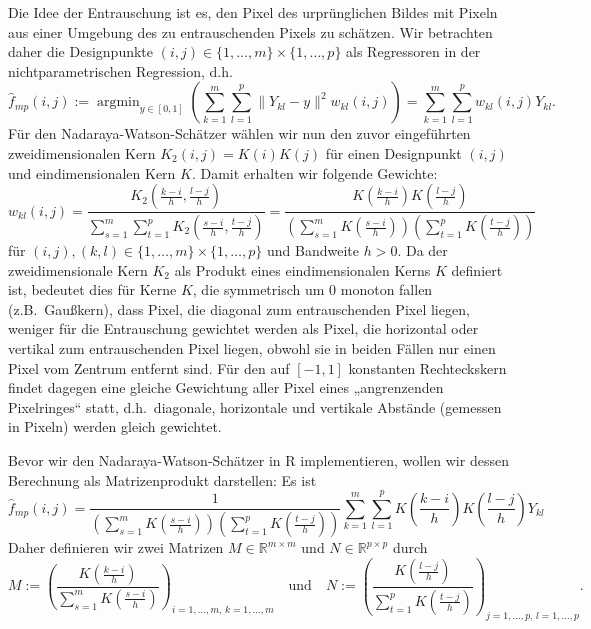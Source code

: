 \documentclass[10pt,]{article}
\DeclareMathOperator*{\argmin}{argmin}
\begin{document}
Die Idee der Entrauschung ist es, den Pixel des urprünglichen Bildes mit
Pixeln aus einer Umgebung des zu entrauschenden Pixels zu schätzen. Wir
betrachten daher die Designpunkte
\((i,j) \in \{1,\ldots,m\} \times \{1,\ldots,p\}\) als Regressoren in
der nichtparametrischen Regression, d.h.\\
\[
\hat{f}_{mp} (i,j) := \argmin_{y \in [0,1]} \left( \sum_{k=1}^m \sum_{l=1}^p \| Y_{kl} - y \|^2 w_{kl}(i,j) \right) = \sum_{k=1}^m \sum_{l=1}^p w_{kl}(i,j) Y_{kl}.
\] Für den Nadaraya-Watson-Schätzer wählen wir nun den zuvor
eingeführten zweidimensionalen Kern \(K_2(i,j) = K(i)K(j)\) für einen
Designpunkt \((i,j)\) und eindimensionalen Kern \(K\). Damit erhalten
wir folgende Gewichte: \[
w_{kl}(i,j) = \frac{K_2\left( \frac{k-i}{h}, \frac{l-j}{h} \right)}{\sum_{s=1}^m \sum_{t=1}^p K_2\left( \frac{s-i}{h}, \frac{t-j}{h} \right)} = \frac{K\left( \frac{k-i}{h} \right) K \left( \frac{l-j}{h} \right)}{\left(\sum_{s=1}^m K\left( \frac{s-i}{h}\right) \right) \left( \sum_{t=1}^p K \left( \frac{t-j}{h} \right) \right)}
\] für \((i,j), (k,l) \in \{1,\ldots,m\} \times \{1,\ldots,p\}\) und
Bandweite \(h>0\). Da der zweidimensionale Kern \(K_2\) als Produkt
eines eindimensionalen Kerns \(K\) definiert ist, bedeutet dies für
Kerne \(K\), die symmetrisch um 0 monoton fallen (z.B.~Gaußkern), dass
Pixel, die diagonal zum entrauschenden Pixel liegen, weniger für die
Entrauschung gewichtet werden als Pixel, die horizontal oder vertikal
zum entrauschenden Pixel liegen, obwohl sie in beiden Fällen nur einen
Pixel vom Zentrum entfernt sind. Für den auf \([-1,1]\) konstanten
Rechteckskern findet dagegen eine gleiche Gewichtung aller Pixel eines
„angrenzenden Pixelringes`` statt, d.h.~diagonale, horizontale und
vertikale Abstände (gemessen in Pixeln) werden gleich gewichtet.

Bevor wir den Nadaraya-Watson-Schätzer in R implementieren, wollen wir
dessen Berechnung als Matrizenprodukt darstellen: Es ist \[
\hat{f}_{mp} (i,j) = \frac{1}{\left(\sum_{s=1}^m K\left( \frac{s-i}{h}\right) \right) \left( \sum_{t=1}^p K \left( \frac{t-j}{h} \right) \right)} \sum_{k=1}^m \sum_{l=1}^p K\left( \frac{k-i}{h} \right) K \left( \frac{l-j}{h} \right) Y_{kl}
\] Daher definieren wir zwei Matrizen \(M \in \mathbb{R}^{m \times m}\)
und \(N \in \mathbb{R}^{p \times p}\) durch \[
M := \left(\frac{K\left( \frac{k-i}{h} \right)}{\sum_{s=1}^m K\left( \frac{s-i}{h}\right)}\right)_{i = 1,\ldots,m, \, k = 1,\ldots,m} \quad \text{und} \quad N:= \left(\frac{K\left( \frac{l-j}{h} \right)}{\sum_{t=1}^p K\left( \frac{t-j}{h}\right)}\right)_{j = 1,\ldots,p, \, l = 1,\ldots,p} .
\]
\end{document}
